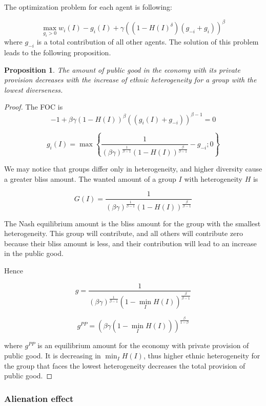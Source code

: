 \documentclass[12pt]{article}
\newtheorem{proposition}{Proposition}
\begin{document}
The optimization problem for each agent is following:

\[ \max_{g_i > 0} w_i(I) - g_i(I) + \gamma( (1 - H(I)^\delta) (g_{-i} + g_i))^\beta  \]
where $g_{-i}$ is a total contribution of all other agents.
The solution of this problem leads to the following proposition.

\begin{proposition}
The amount of public good in the economy with its private provision decreases with the increase of ethnic heterogeneity for a group with the lowest diverseness.
\end{proposition}

\begin{proof}
The FOC is
\[ -1 + \beta\gamma (1 - H(I))^{\beta} ((g_i(I) + g_{-i} ))^{\beta-1} = 0 \]

\[ g_i(I) = \max \left\{\frac{1}{(\beta\gamma )^\frac{1}{\beta - 1} (1 - H(I))^\frac{\beta}{\beta-1} } - g_{-i} ; 0  \right\}   \]

We may notice that groups differ only in heterogeneity, and higher diversity cause a greater bliss amount. The wanted amount of a group $I$ with heterogeneity $H$ is 

\[ G(I) =  \frac{1}{(\beta\gamma )^\frac{1}{\beta - 1} (1 - H(I))^\frac{\beta}{\beta-1} } \]

The Nash equilibrium amount is the bliss amount for the group with the smallest heterogeneity. This group will contribute, and all others will contribute zero because their bliss amount is less, and their contribution will lead to an increase in the public good.

Hence 

\[g = \frac{1}{(\beta\gamma )^\frac{1}{\beta - 1} (1 - \min_{I} H(I))^\frac{\beta}{\beta-1} } \]

\begin{equation}
    g^{PP} = (\beta\gamma  ( 1 - \min_{I} H(I)))^\frac{\beta}{1 -\beta}
    \label{eq:privat}
\end{equation}

where $g^{PP}$ is an equilibrium amount for the economy with private provision of public good. It is decreasing in $\min_{I} H(I)$, thus higher ethnic heterogeneity for the group that faces the lowest heterogeneity decreases the total provision of public good. 
\end{proof}

\subsubsection{Alienation effect}
\end{document}
